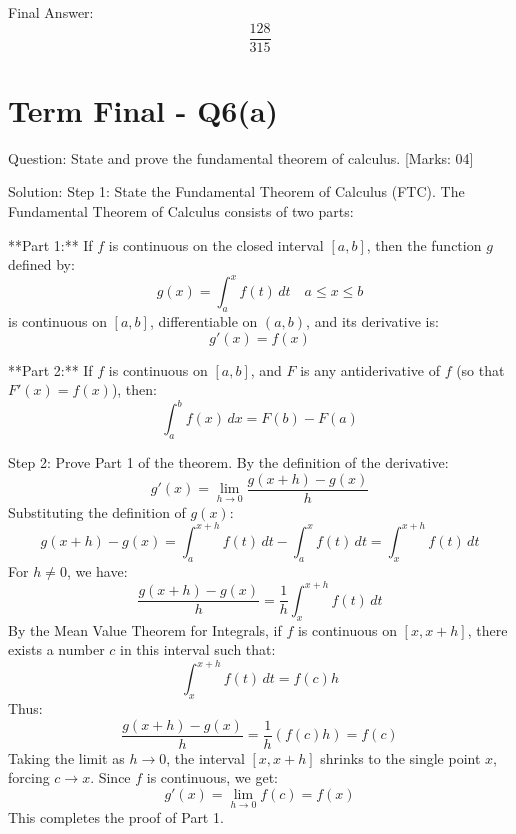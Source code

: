 \documentclass[11pt, a4paper]{article}
\begin{document}
Final Answer:
\[
\boxed{\frac{128}{315}}
\]





\section*{Term Final - Q6(a)}

Question:
State and prove the fundamental theorem of calculus. [Marks: 04]

Solution:
Step 1: State the Fundamental Theorem of Calculus (FTC).
The Fundamental Theorem of Calculus consists of two parts:

**Part 1:** If $f$ is continuous on the closed interval $[a, b]$, then the function $g$ defined by:
\[
g(x) = \int_{a}^{x} f(t) \, dt \quad a \le x \le b
\]
is continuous on $[a, b]$, differentiable on $(a, b)$, and its derivative is:
\[
g'(x) = f(x)
\]

**Part 2:** If $f$ is continuous on $[a, b]$, and $F$ is any antiderivative of $f$ (so that $F'(x) = f(x)$), then:
\[
\int_{a}^{b} f(x) \, dx = F(b) - F(a)
\]

Step 2: Prove Part 1 of the theorem.
By the definition of the derivative:
\[
g'(x) = \lim_{h \to 0} \frac{g(x+h) - g(x)}{h}
\]
Substituting the definition of $g(x)$:
\[
g(x+h) - g(x) = \int_{a}^{x+h} f(t) \, dt - \int_{a}^{x} f(t) \, dt = \int_{x}^{x+h} f(t) \, dt
\]
For $h \ne 0$, we have:
\[
\frac{g(x+h) - g(x)}{h} = \frac{1}{h} \int_{x}^{x+h} f(t) \, dt
\]
By the Mean Value Theorem for Integrals, if $f$ is continuous on $[x, x+h]$, there exists a number $c$ in this interval such that:
\[
\int_{x}^{x+h} f(t) \, dt = f(c) h
\]
Thus:
\[
\frac{g(x+h) - g(x)}{h} = \frac{1}{h} (f(c) h) = f(c)
\]
Taking the limit as $h \to 0$, the interval $[x, x+h]$ shrinks to the single point $x$, forcing $c \to x$. Since $f$ is continuous, we get:
\[
g'(x) = \lim_{h \to 0} f(c) = f(x)
\]
This completes the proof of Part 1.
\end{document}
